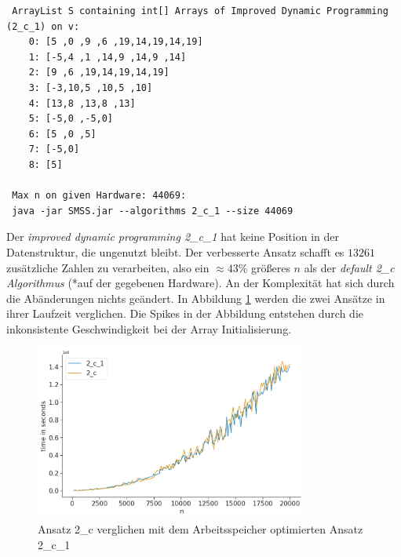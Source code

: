 \documentclass[10pt]{article}
\begin{document}
\begin{verbatim}
 ArrayList S containing int[] Arrays of Improved Dynamic Programming (2_c_1) on v:
    0: [5 ,0 ,9 ,6 ,19,14,19,14,19]
    1: [-5,4 ,1 ,14,9 ,14,9 ,14]
    2: [9 ,6 ,19,14,19,14,19]
    3: [-3,10,5 ,10,5 ,10]
    4: [13,8 ,13,8 ,13]
    5: [-5,0 ,-5,0]
    6: [5 ,0 ,5]
    7: [-5,0]
    8: [5]

 Max n on given Hardware: 44069:
 java -jar SMSS.jar --algorithms 2_c_1 --size 44069
\end{verbatim}

Der \textit{improved dynamic programming 2\_c\_1} hat keine Position in der 
Datenstruktur, die ungenutzt bleibt. Der verbesserte Ansatz schafft es $13261$ zusätzliche
Zahlen zu verarbeiten, also ein $\approx 43\%$ grö\ss eres $n$ als der \textit{default 2\_c Algorithmus} 
(*auf der gegebenen Hardware). An der Komplexität hat sich durch die Abänderungen nichts geändert.
In Abbildung \ref{fig:time_comp_2c} werden die zwei Ansätze in ihrer Laufzeit verglichen.
Die Spikes in der Abbildung entstehen durch die inkonsistente Geschwindigkeit bei der Array Initialisierung.


\begin{figure}[t]
    \centering
    \includegraphics[width=0.8\textwidth]{../times_2c_20000.png}
    \caption{Ansatz 2\_c verglichen mit dem Arbeitsspeicher optimierten Ansatz 2\_c\_1}
    \label{fig:time_comp_2c}
\end{figure}
\end{document}
